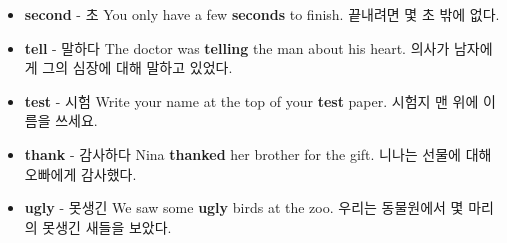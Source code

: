 \documentclass{article}
\begin{document}
\begin{addmargin}[1em]{1em}
\begin{itemize}
        \item \fontsize{12pt}{14pt}\selectfont \textbf{second} - 초 \newline
        You only have a few \textbf{seconds} to finish. \newline
        끝내려면 몇 초 밖에 없다.
        
        \item \fontsize{12pt}{14pt}\selectfont \textbf{tell} - 말하다 \newline
        The doctor was \textbf{telling} the man about his heart. \newline
        의사가 남자에게 그의 심장에 대해 말하고 있었다.

        \item \fontsize{12pt}{14pt}\selectfont \textbf{test} - 시험 \newline
        Write your name at the top of your \textbf{test} paper. \newline
        시험지 맨 위에 이름을 쓰세요.
        
        \item \fontsize{12pt}{14pt}\selectfont \textbf{thank} - 감사하다 \newline
        Nina \textbf{thanked} her brother for the gift. \newline
        니나는 선물에 대해 오빠에게 감사했다.
        
        \item \fontsize{12pt}{14pt}\selectfont \textbf{ugly} - 못생긴 \newline
        We saw some \textbf{ugly} birds at the zoo. \newline
        우리는 동물원에서 몇 마리의 못생긴 새들을 보았다.
    \end{itemize}
\end{addmargin}
\end{document}
